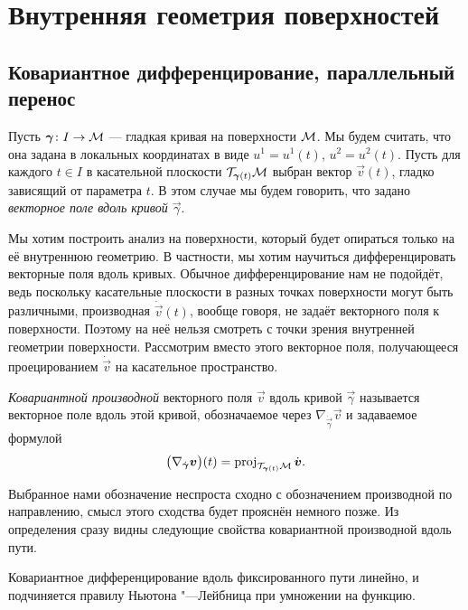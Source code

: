 \section{Внутренняя геометрия поверхностей}

\subsection{Ковариантное дифференцирование, параллельный перенос}

Пусть $\boldsymbol{\gamma}\colon I \to \mathcal{M}$ --- гладкая кривая на поверхности $\mathcal{M}$. Мы будем считать, что она задана в локальных координатах в виде $u^1 = u^1(t)$, $u^2 = u^2(t)$. Пусть для каждого $t \in I$ в касательной плоскости $\mathcal{T}_{\boldsymbol{\gamma}(t)}\mathcal{M}$ выбран вектор $\vec{v}(t)$, гладко зависящий от параметра $t$. В этом случае мы будем говорить, что задано \textit{векторное поле вдоль кривой $\vec{\gamma}$}.

Мы хотим построить анализ на поверхности, который будет опираться только на её внутреннюю геометрию. В частности, мы хотим научиться дифференцировать векторные поля вдоль кривых. Обычное дифференцирование нам не подойдёт, ведь поскольку касательные плоскости в разных точках поверхности могут быть различными, производная $\dot{\vec{v}}(t)$, вообще говоря, не задаёт векторного поля к поверхности. Поэтому на неё нельзя смотреть с точки зрения внутренней геометрии поверхности. Рассмотрим вместо этого векторное поля, получающееся проецированием $\dot{\vec{v}}$ на касательное пространство.

\begin{definition}
	\textit{Ковариантной производной} векторного поля $\vec{v}$ вдоль кривой $\vec{\gamma}$ называется векторное поле вдоль этой кривой, обозначаемое через $\nabla_{\dot{\vec{\gamma}}}\vec{v}$ и задаваемое формулой
	\[
		\big(\nabla_{\dot{\boldsymbol{\gamma}}}\boldsymbol{v}\big)(t) = \operatorname{proj}_{\mathcal{T}_{\boldsymbol{\gamma}(t)}\mathcal{M}}\dot{\boldsymbol{v}}.
	\]
\end{definition}

Выбранное нами обозначение неспроста сходно с обозначением производной по направлению, смысл этого сходства будет прояснён немного позже. Из определения сразу видны следующие свойства ковариантной производной вдоль пути.

\begin{proposition}
	Ковариантное дифференцирование вдоль фиксированного пути линейно, и подчиняется правилу Ньютона "---Лейбница при умножении на функцию.
\end{proposition}

